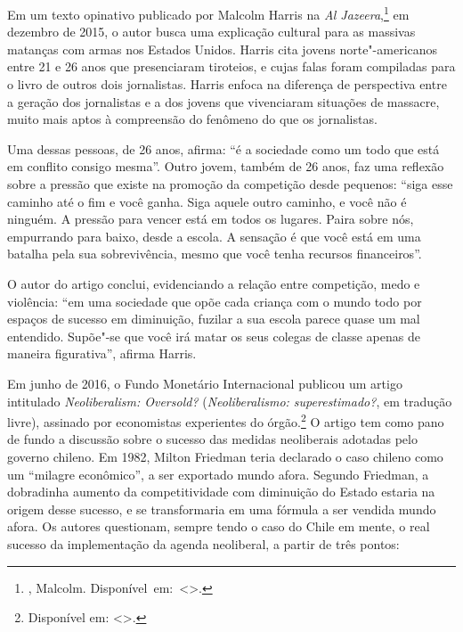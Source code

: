 \asterisc

Em um texto opinativo publicado por Malcolm Harris na \emph{Al Jazeera},\footnote{, Malcolm. \mbox{Disponível em: \textless{}{}\textgreater{}.}}
em dezembro de 2015, o autor busca uma explicação cultural para as
massivas matanças com armas nos Estados Unidos. Harris cita jovens norte"-americanos entre 21 e 26 anos que presenciaram tiroteios, e cujas
falas foram compiladas para o livro de outros dois jornalistas. Harris
enfoca na diferença de perspectiva entre a geração dos jornalistas e a
dos jovens que vivenciaram situações de massacre, muito mais aptos à
compreensão do fenômeno do que os jornalistas.

Uma dessas pessoas, de 26 anos, afirma: ``é a sociedade como um
todo que está em conflito consigo mesma''. Outro jovem, também de 26
anos, faz uma reflexão sobre a pressão que existe na promoção da
competição desde pequenos: ``siga esse caminho até o fim e você ganha.
Siga aquele outro caminho, e você não é ninguém. A pressão para vencer
está em todos os lugares. Paira sobre nós, empurrando para baixo, desde
a escola. A sensação é que você está em uma batalha pela sua
sobrevivência, mesmo que você tenha recursos
financeiros''.

O autor do artigo conclui, evidenciando a relação entre
competição, medo e violência: ``em uma sociedade que opõe cada criança
com o mundo todo por espaços de sucesso em diminuição, fuzilar a sua
escola parece quase um mal entendido. Supõe"-se que você irá matar os
seus colegas de classe apenas de maneira figurativa'', afirma
Harris.

\asterisc

Em junho de 2016, o Fundo Monetário Internacional publicou um artigo
intitulado \emph{Neoliberalism: Oversold?} (\emph{Neoliberalismo:
superestimado?}, em tradução livre), assinado por economistas
experientes do órgão.\footnote{Disponível em: \textless{}{}\textgreater{}.}
O artigo tem como pano de fundo a discussão sobre o sucesso das medidas
neoliberais adotadas pelo governo chileno. Em 1982, Milton Friedman
teria declarado o caso chileno como um ``milagre econômico'', a ser
exportado mundo afora. Segundo Friedman, a dobradinha aumento da
competitividade com diminuição do Estado estaria na origem desse
sucesso, e se transformaria em uma fórmula a ser vendida mundo afora.
Os autores questionam, sempre tendo o caso do Chile em mente, o real
sucesso da implementação da agenda neoliberal, a partir de três pontos:

